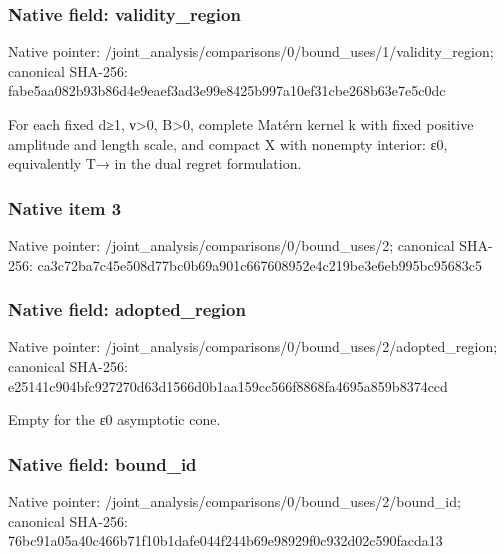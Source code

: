 \documentclass[10pt,a4paper]{article}
\begin{document}
\subsubsection{Native field: validity\_\allowbreak{}region}
Native pointer: /joint\_\allowbreak{}analysis/comparisons/0/bound\_\allowbreak{}uses/1/validity\_\allowbreak{}region; canonical SHA-256: fabe5aa082b93b86d4e9eaef3ad3e99e8425b997a10ef31cbe268b63e7e5c0dc

\begingroup\raggedright\sloppy For each fixed d{\AtlasUnicodeSymbols ≥}\allowbreak{}1,\allowbreak{} {\AtlasUnicodeText ν}\allowbreak{}>0,\allowbreak{} B>0,\allowbreak{} complete Mat{\AtlasUnicodeText é}\allowbreak{}rn kernel k with fixed positive amplitude and length scale,\allowbreak{} and compact X with nonempty interior:\allowbreak{} {\AtlasUnicodeText ε}\allowbreak{}0,\allowbreak{} equivalently T{\AtlasUnicodeSymbols →}\allowbreak{} in the dual regret formulation.\par\endgroup

\subsubsection{Native item 3}
Native pointer: /joint\_\allowbreak{}analysis/comparisons/0/bound\_\allowbreak{}uses/2; canonical SHA-256: ca3c72ba7c45e508d77bc0b69a901c667608952e4c219be3e6eb995bc95683c5

\subsubsection{Native field: adopted\_\allowbreak{}region}
Native pointer: /joint\_\allowbreak{}analysis/comparisons/0/bound\_\allowbreak{}uses/2/adopted\_\allowbreak{}region; canonical SHA-256: e25141c904bfc927270d63d1566d0b1aa159cc566f8868fa4695a859b8374ccd

\begingroup\raggedright\sloppy Empty for the {\AtlasUnicodeText ε}\allowbreak{}0 asymptotic cone.\par\endgroup

\subsubsection{Native field: bound\_\allowbreak{}id}
Native pointer: /joint\_\allowbreak{}analysis/comparisons/0/bound\_\allowbreak{}uses/2/bound\_\allowbreak{}id; canonical SHA-256: 76bc91a05a40c466b71f10b1dafe044f244b69e98929f0c932d02c590facda13
\end{document}
